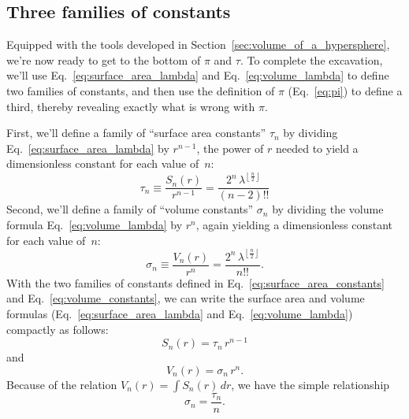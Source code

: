 {%



  \subsection{Three families of constants} %
  \label{sec:three_families_of_constants}

Equipped with the tools developed in Section~\ref{sec:volume_of_a_hypersphere}, we're now ready to get to the bottom of $\pi$ and $\tau$. To complete the excavation, we'll use Eq.~\eqref{eq:surface_area_lambda} and Eq.~\eqref{eq:volume_lambda} to define two families of constants, and then use the definition of $\pi$ (Eq.~\eqref{eq:pi}) to define a third, thereby revealing exactly what is wrong with $\pi$.

First, we'll define a family of ``surface area constants'' $\tau_n$ by dividing \linebreak Eq.~\eqref{eq:surface_area_lambda} by $r^{n-1}$, the power of $r$ needed to yield a dimensionless constant for each value of~$n$:
\begin{equation}
\label{eq:surface_area_constants}
\tau_n \equiv \frac{S_n(r)}{r^{n-1}} = \frac{2^n\,\lambda^{\left\lfloor \frac{n}{2} \right\rfloor}}{(n-2)!!}
\end{equation}
Second, we'll define a family of ``volume constants'' $\sigma_n$ by dividing the volume formula Eq.~\eqref{eq:volume_lambda} by $r^n$, again yielding a dimensionless constant for each value of~$n$:
\begin{equation}
\label{eq:volume_constants}
\sigma_n \equiv \frac{V_n(r)}{r^n} = \frac{2^n\,\lambda^{\left\lfloor \frac{n}{2} \right\rfloor}}{n!!}.
\end{equation}
With the two families of constants defined in Eq.~\eqref{eq:surface_area_constants} and Eq.~\eqref{eq:volume_constants}, we can write the surface area and volume formulas (Eq.~\eqref{eq:surface_area_lambda} and Eq.~\eqref{eq:volume_lambda}) compactly as follows:
\[ S_n(r) = \tau_n\,r^{n-1} \]
and
\[ V_n(r) = \sigma_n\,r^n. \]
Because of the relation $V_n(r) = \int S_n(r)\,dr$, we have the simple relationship
\[
\sigma_n = \frac{\tau_n}{n}.
\]

}
